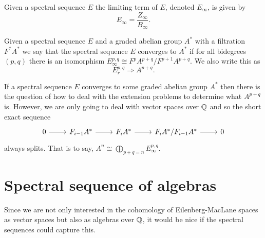 \documentclass[../main.tex]{subfiles}
\begin{document}
\begin{definition}
    Given a spectral sequence \( E \) the limiting term of \( E \),
    denoted \( E_\infty \), is given by
    \begin{equation}
        E_\infty = \frac{Z_\infty}{B_\infty}.
    \end{equation}
\end{definition}
\begin{definition}
    Given a spectral sequence \( E \) and a graded abelian group
    \( A^* \) with a filtration \( F^*A^* \) we
    say that the spectral sequence \( E \) converges to \( A^* \) if
    for all bidegrees \( (p, q) \) there is an isomorphism 
    \( E_\infty^{p,q}\cong F^pA^{p+q}/F^{p+1}A^{p+q} \). We also
    write this as
    \begin{equation}
        E^{p,q}_r \Longrightarrow A^{p+q}.
    \end{equation}
\end{definition}
If a spectral sequence \( E \) converges to some graded abelian group
\( A^* \) then there is the question of how to deal with the
extension problems to determine what \( A^{p+q} \)
is. However, we are only going to deal with vector spaces over \( \mathbb{Q} \)
and so the short exact sequence
\begin{equation}
    \begin{tikzcd}
        0 & {F_{i-1}A^*} & {F_iA^*} & {F_iA^*/F_{i-1}A^*} & 0
        \arrow[from=1-1, to=1-2]
        \arrow[from=1-2, to=1-3]
        \arrow[from=1-3, to=1-4]
        \arrow[from=1-4, to=1-5]
    \end{tikzcd}
\end{equation}
always splits. That is to say, \( A^{n}\cong\bigoplus_{p+q=n}E^{p,q}_\infty \).

\section{Spectral sequence of algebras}
Since we are not only interested in the cohomology of Eilenberg-MacLane
spaces as vector spaces but also as algebras over \( \mathbb{Q} \), it would
be nice if the spectral sequences could capture this. 
\end{document}
